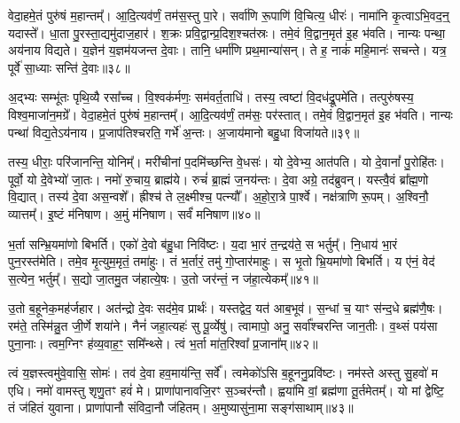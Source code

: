 वेदा॒हमे॒तं पुरु॑षं म॒हान्तम्᳚। 
आ॒दि॒त्यव॑र्णं॒ तम॑स॒स्तु पा॒रे। 
सर्वा॑णि रू॒पाणि॑ वि॒चित्य॒ धीरः॑। 
नामा॑नि कृ॒त्वाऽभि॒वद॒न्॒ यदास्ते᳚। 
धा॒ता पु॒रस्ता॒द्यमु॑दाज॒हार॑। 
श॒क्रः प्रवि॒द्वान्प्र॒दिश॒श्चत॑स्रः। 
तमे॒वं वि॒द्वान॒मृत॑ इ॒ह भ॑वति। 
नान्यः पन्था॒ अय॑नाय विद्यते। 
य॒ज्ञेन॑ य॒ज्ञम॑यजन्त दे॒वाः। 
तानि॒ धर्मा॑णि प्रथ॒मान्या॑सन्। 
ते ह॒ नाकं॑ महि॒मानः॑ सचन्ते। 
यत्र॒ पूर्वे॑ सा॒ध्याः सन्ति॑ दे॒वाः॥३८॥\ip
{}

अ॒द्भ्यः सम्भू॑तः पृथि॒व्यै रसा᳚च्च। 
वि॒श्वक॑र्मणः॒ सम॑वर्त॒ताधि॑। 
तस्य॒ त्वष्टा॑ वि॒दध॑द्रू॒पमे॑ति। 
तत्पुरु॑षस्य॒ विश्व॒माजा॑न॒मग्रे᳚। 
वेदा॒हमे॒तं पुरु॑षं म॒हान्तम्᳚। 
आ॒दि॒त्यव॑र्णं॒ तम॑सः॒ पर॑स्तात्। 
तमे॒वं वि॒द्वान॒मृत॑ इ॒ह भ॑वति। 
नान्यः पन्था॑ विद्य॒तेऽय॑नाय। 
प्र॒जाप॑तिश्चरति॒ गर्भे॑ अ॒न्तः। 
अ॒जाय॑मानो बहु॒धा विजा॑यते॥३९॥\ip

तस्य॒ धीराः॒ परि॑जानन्ति॒ योनिम्᳚। 
मरी॑चीनां प॒दमि॑च्छन्ति वे॒धसः॑। 
यो दे॒वेभ्य॒ आत॑पति। 
यो दे॒वानां᳚ पु॒रोहि॑तः। 
पूर्वो॒ यो दे॒वेभ्यो॑ जा॒तः। 
नमो॑ रु॒चाय॒ ब्राह्म॑ये। 
रुचं॑ ब्रा॒ह्मं ज॒नय॑न्तः। 
दे॒वा अग्रे॒ तद॑ब्रुवन्। 
यस्त्वै॒वं ब्रा᳚ह्म॒णो वि॒द्यात्। 
तस्य॑ दे॒वा अस॒न्वशे᳚। 
ह्रीश्च॑ ते ल॒क्ष्मीश्च॒ पत्न्यौ᳚। 
अ॒हो॒रा॒त्रे पा॒र्श्वे। 
नक्ष॑त्राणि रू॒पम्। 
अ॒श्विनौ॒ व्यात्तम्᳚। 
इ॒ष्टं म॑निषाण। 
अ॒मुं म॑निषाण। 
सर्वं॑ मनिषाण॥४०॥\ip
\anuvakamend[जा॒य॒ते॒ वशे॑ स॒प्त च॑]

भ॒र्ता सन्भ्रि॒यमा॑णो बिभर्ति। 
एको॑ दे॒वो ब॑हु॒धा निवि॑ष्टः। 
य॒दा भा॒रं त॒न्द्रय॑ते॒ स भर्तुम्᳚। 
नि॒धाय॑ भा॒रं पुन॒रस्त॑मेति। 
तमे॒व मृ॒त्युम॒मृतं॒ तमा॑हुः। 
तं भ॒र्तारं॒ तमु॑ गो॒प्तार॑माहुः। 
स भृ॒तो भ्रि॒यमा॑णो बिभर्ति। 
य ए॑नं॒ वेद॑ स॒त्येन॒ भर्तुम्᳚। 
स॒द्यो जा॒तमु॒त ज॑हात्ये॒षः। 
उ॒तो जर॑न्तं॒ न ज॑हा॒त्येकम्᳚॥४१॥\ip

उ॒तो ब॒हूनेक॒मह॑र्जहार। 
अत॑न्द्रो दे॒वः सद॑मे॒व प्रार्थः॑। 
यस्तद्वेद॒ यत॑ आब॒भूव॑। 
स॒न्धां च॒ याꣳ स॑न्द॒धे ब्रह्म॑णै॒षः। 
रम॑ते॒ तस्मि॑न्नु॒त जी॒र्णे शया॑ने। 
नैनं॑ जहा॒त्यहः॑ सु पू॒र्व्येषु॑। 
त्वामापो॒ अनु॒ सर्वा᳚श्चरन्ति जान॒तीः। 
व॒थ्सं पय॑सा पुना॒नाः। 
त्वम॒ग्निꣳ ह॑व्य॒वाह॒ꣳ॒ समि᳚न्थ्से। 
त्वं भ॒र्ता मा॑त॒रिश्वा᳚ प्र॒जाना᳚म्॥४२॥\ip

त्वं य॒ज्ञस्त्वमु॑वे॒वासि॒ सोमः॑। 
तव॑ दे॒वा हव॒माय॑न्ति॒ सर्वे᳚। 
त्वमेको॑ऽसि ब॒हूननु॒प्रवि॑ष्टः। 
नम॑स्ते अस्तु सु॒हवो॑ म एधि। 
नमो॑ वामस्तु शृणु॒तꣳ हवं॑ मे। 
प्राणा॑पानावजि॒रꣳ स॒ञ्चर॑न्तौ। 
ह्वया॑मि वां॒ ब्रह्म॑णा तू॒र्तमेतम्᳚। 
यो मां द्वेेष्टि॒ तं ज॑हितं युवाना। 
प्राणा॑पानौ संविदा॒नौ ज॑हितम्। 
अ॒मुष्यासु॑ना॒मा सङ्ग॑साथाम्॥४३॥\ip

